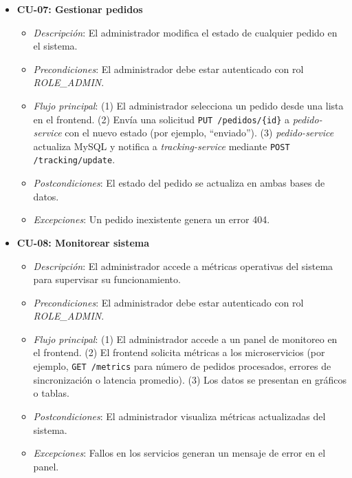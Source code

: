 \documentclass[a4paper,12pt]{article}
\begin{document}
\begin{itemize}
    \item \textbf{CU-07: Gestionar pedidos}
    \begin{itemize}
        \item \textit{Descripción}: El administrador modifica el estado de cualquier pedido en el sistema.
        \item \textit{Precondiciones}: El administrador debe estar autenticado con rol \textit{ROLE\_ADMIN}.
        \item \textit{Flujo principal}: (1) El administrador selecciona un pedido desde una lista en el frontend. (2) Envía una solicitud \texttt{PUT /pedidos/\{id\}} a \textit{pedido-service} con el nuevo estado (por ejemplo, ``enviado''). (3) \textit{pedido-service} actualiza MySQL y notifica a \textit{tracking-service} mediante \texttt{POST /tracking/update}.
        \item \textit{Postcondiciones}: El estado del pedido se actualiza en ambas bases de datos.
        \item \textit{Excepciones}: Un pedido inexistente genera un error 404.
    \end{itemize}

    \item \textbf{CU-08: Monitorear sistema}
    \begin{itemize}
        \item \textit{Descripción}: El administrador accede a métricas operativas del sistema para supervisar su funcionamiento.
        \item \textit{Precondiciones}: El administrador debe estar autenticado con rol \textit{ROLE\_ADMIN}.
        \item \textit{Flujo principal}: (1) El administrador accede a un panel de monitoreo en el frontend. (2) El frontend solicita métricas a los microservicios (por ejemplo, \texttt{GET /metrics} para número de pedidos procesados, errores de sincronización o latencia promedio). (3) Los datos se presentan en gráficos o tablas.
        \item \textit{Postcondiciones}: El administrador visualiza métricas actualizadas del sistema.
        \item \textit{Excepciones}: Fallos en los servicios generan un mensaje de error en el panel.
    \end{itemize}
\end{itemize}
\end{document}

